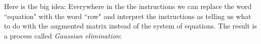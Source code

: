 Here is the big idea: 
Everywhere in the the instructions we can replace the word ``equation" with the word ``row" and interpret the instructions as telling us what to do with the augmented matrix instead of the system of equations.
The result is a process called {\it Gaussian elimination}: 
%
%


